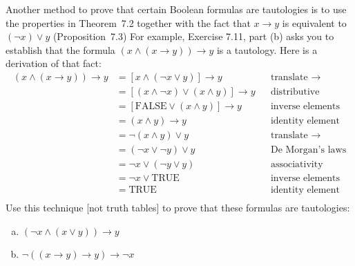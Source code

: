 \documentclass{article}
\theoremstyle{definition}
\begin{document}
Another method to prove that certain Boolean formulas are tautologies is to use the properties in Theorem~7.2 together with the fact that $x \rightarrow y$ is equivalent to $(\lnot x) \lor y$ (Proposition~7.3) For example, Exercise 7.11, part (b) asks you to establish that the formula $(x \land (x \rightarrow y)) \rightarrow y$ is  a tautology.  Here is a derivation of that fact:
    \begin{align*}
        (x \land (x \rightarrow y)) \rightarrow y
            & = [x \land (\lnot x \lor y)] \rightarrow y
            && \text{translate $\rightarrow$} 
                \\
            & = [(x \land \lnot x) \lor (x \land y)] \rightarrow y
            && \text{distributive}
                \\
            & = [\mathrm{FALSE} \lor (x\land y)] \rightarrow y
            && \text{inverse elements}
                \\
            & = (x\land y) \rightarrow y
            && \text{identity element}
                \\
            & = \lnot(x\land y) \lor y
            && \text{translate $\rightarrow$}
                \\
            & = (\lnot x \lor \lnot y) \lor y
            && \text{De~Morgan's laws}
                \\
            & = \lnot x \lor (\lnot y \lor y)
            && \text{associativity}
                \\
            & = \lnot x \lor \mathrm{TRUE}
            && \text{inverse elements}
                \\
            & = \mathrm{TRUE}
            && \text{identity element}
                \\
    \end{align*}
    Use this technique [not truth tables] to prove that these formulas are tautologies:
    \begin{enumerate}[a)] %
        \item $(\lnot x \land (x \lor y)) \rightarrow y$
        \item $\lnot ( (x \rightarrow y) \rightarrow  y) \rightarrow \lnot x$
    \end{enumerate}
\end{document}
